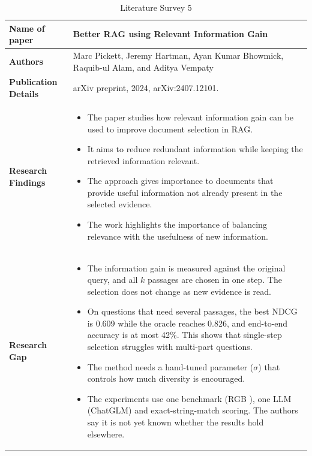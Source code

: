 \documentclass[12pt,a4paper]{report}
\begin{document}
\begin{longtable}{|p{1.25in}|p{5.15in}|}
\caption{Literature Survey 5}\label{tab:lit5}\\
\hline
\hline

\textbf{Name of paper} & Better RAG using Relevant Information Gain \cite{pickett2024better} \\ \hline

\textbf{Authors} & Marc Pickett, Jeremy Hartman, Ayan Kumar Bhowmick, Raquib-ul Alam, and Aditya Vempaty \\ \hline

\textbf{Publication Details} & arXiv preprint, 2024, arXiv:2407.12101. \\ \hline

\textbf{Research Findings} &
\begin{itemize}[leftmargin=0.18in,itemsep=0.05in,topsep=0pt,parsep=0pt]
\item The paper studies how relevant information gain can be used to improve document selection in RAG.
\item It aims to reduce redundant information while keeping the retrieved information relevant.
\item The approach gives importance to documents that provide useful information not already present in the selected evidence.
\item The work highlights the importance of balancing relevance with the usefulness of new information.
\end{itemize} \\ \hline

\textbf{Research Gap} &
\begin{itemize}[leftmargin=0.18in,itemsep=0.05in,topsep=0pt,parsep=0pt]
\item The information gain is measured against the original query, and all $k$ passages are chosen in one step. The selection does not change as new evidence is read. %
\item On questions that need several passages, the best NDCG is 0.609 while the oracle reaches 0.826, and end-to-end accuracy is at most 42\%. This shows that single-step selection struggles with multi-part questions. %
\item The method needs a hand-tuned parameter ($\sigma$) that controls how much diversity is encouraged. %
\item The experiments use one benchmark (RGB \cite{chen2024rgb}), one LLM (ChatGLM) and exact-string-match scoring. The authors say it is not yet known whether the results hold elsewhere. %
\end{itemize} \\ \hline


\end{longtable}
\end{document}
